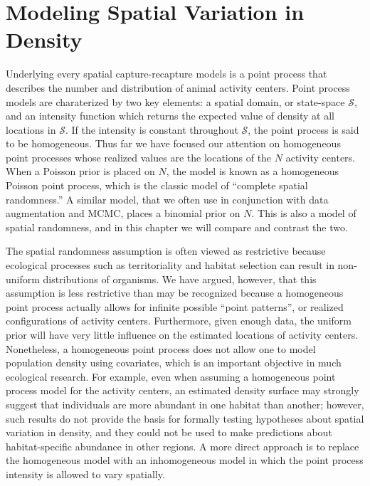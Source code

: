 \chapter{
Modeling Spatial Variation in Density
}
\label{chapt.state-space}

\vspace{0.3cm}

Underlying every spatial capture-recapture models is a point process
that describes the number and distribution of animal activity
centers. Point process models are charaterized by two key
elements: a spatial domain, or state-space $\mathcal{S}$, and an
intensity function which returns the
expected value of density at all locations in $\mathcal{S}$.
If the intensity is constant throughout $\mathcal{S}$,
the point process is said to be homogeneous.
Thus far we have focused our attention on homogeneous %
point processes whose realized values are the locations of the $N$
activity centers. When a Poisson prior is
placed on $N$, the model is known as a homogeneous Poisson point process, which
is the classic model of ``complete spatial randomness.''
A similar model, that we often use in conjunction with data
augmentation and MCMC, places a binomial prior on $N$. This is also a
model of spatial randomness, and in this chapter we will compare and
contrast the two.

The spatial randomness assumption is often viewed as restrictive
because ecological processes such as
territoriality and habitat selection can result in non-uniform
distributions of organisms. We have argued, however, that this
assumption is less restrictive than may be recognized because a
homogeneous point process actually allows for infinite
possible ``point patterns'', or realized configurations of activity
centers. Furthermore, given enough data,
the uniform prior will have very little influence on the estimated
locations of activity centers. Nonetheless, a homogeneous point
process does not allow one to model population density using
covariates, which is an important objective in much ecological research.
For example, even when assuming a homogeneous point process model for
the activity centers, an estimated density surface may strongly
suggest that individuals are more abundant in one habitat than
another; however, such results do not provide the basis for formally testing
hypotheses about spatial variation in density, and they could not be
used to make predictions about habitat-specific abundance in other
regions. A more direct approach is to replace the homogeneous model
with an inhomogeneous model in which the point process intensity
is allowed to vary spatially.

